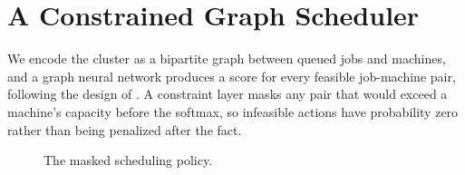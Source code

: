 \chapter{A Constrained Graph Scheduler}
\label{ch:method}

We encode the cluster as a bipartite graph between queued jobs and machines, and a graph neural
network produces a score for every feasible job-machine pair, following the design of
\citet{mao2019}. A constraint layer masks any pair that would exceed a machine's capacity
before the softmax, so infeasible actions have probability zero rather than being penalized
after the fact.

\begin{figure}[htbp]
  \centering
  \caption{The masked scheduling policy.}
  \label{fig:policy}
\end{figure}
